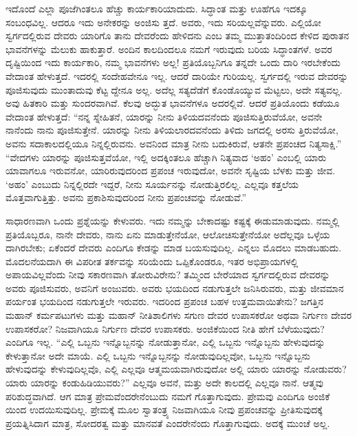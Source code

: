 ಇದೊಂದೆ ಎಲ್ಲಾ ಪೂಜೆಗಿಂತಲೂ ಹೆಚ್ಚು ಕಾರ್ಯಕಾರಿಯಾದುದು. ಸಿದ್ಧಾಂತ ಮತ್ತು ಊಹೆಗೂ ಇದಕ್ಕೂ ಸಂಬಂಧವಿಲ್ಲ. ಆದರೂ ಇದು ಅನೇಕರನ್ನು ಅಂಜಿಸು ತ್ತದೆ. ಅವರು, ಇದು ಸರಿಯಲ್ಲವೆನ್ನುವರು. ಎಲ್ಲಿಯೋ ಸ್ವರ್ಗದಲ್ಲಿರುವ ದೇವರು ಯಾರಿಗೊ ತಾನು ದೇವರೆಂದು ಹೇಳಿದನು ಎಂಬ ತಮ್ಮ ಮುತ್ತಾತಂದಿರಿಂದ ಕೇಳಿದ ಪುರಾತನ ಭಾವನೆಗಳನ್ನು ಮೆಲುಕು ಹಾಕುತ್ತಾರೆ. ಅಂದಿನ ಕಾಲದಿಂದಲೂ ನಮಗೆ ಇರುವುದು ಬರಿಯ ಸಿದ್ಧಾಂತಗಳೆ. ಅವರ ದೃಷ್ಟಿಯಿಂದ ಇದು ಕಾರ್ಯಕಾರಿ, ನಮ್ಮ ಭಾವನೆಗಳು ಅಲ್ಲ! ಪ್ರತಿಯೊಬ್ಬನಿಗೂ ತನ್ನದೇ ಒಂದು ದಾರಿ ಇರಬೇಕೆಂದು ವೇದಾಂತ ಹೇಳುತ್ತದೆ. ಇದರಲ್ಲಿ ಸಂದೇಹವೇನೂ ಇಲ್ಲ. ಆದರೆ ದಾರಿಯೇ ಗುರಿಯಲ್ಲ. ಸ್ವರ್ಗದಲ್ಲಿ ಇರುವ ದೇವರನ್ನು ಪೂಜಿಸುವುದು ಮುಂತಾದುವು ಕೆಟ್ಟ ದ್ದೇನೂ ಅಲ್ಲ. ಅದೆಲ್ಲ ಸತ್ಯದೆಡೆಗೆ ಕೊಂಡೊಯ್ಯುವ ಮೆಟ್ಟಲು, ಅದೇ ಸತ್ಯವಲ್ಲ. ಅವು ಹಿತಕಾರಿ ಮತ್ತು ಸುಂದರವಾಗಿವೆ. ಕೆಲವು ಅದ್ಭುತ ಭಾವನೆಗಳೂ ಅದರಲ್ಲಿವೆ. ಆದರೆ ಪ್ರತಿಯೊಂದು ಕಡೆಯೂ ವೇದಾಂತ ಹೇಳುತ್ತದೆ: “ನನ್ನ ಸ್ನೇಹಿತನೆ, ಯಾರನ್ನು ನೀನು ತಿಳಿಯದವನೆಂದು ಪೂಜಿಸುತ್ತಿರುವೆಯೋ, ಅವನೇ ನಾನೆಂದು ನಾನು ಪೂಜಿಸುತ್ತೇನೆ. ಯಾರನ್ನು ನೀನು ತಿಳಿಯಲಾರದವನೆಂದು ತಿಳಿದು ಜಗದಲ್ಲಿ ಅರಸು ತ್ತಿರುವೆಯೋ, ಅವನು ಸದಾಕಾಲದಲ್ಲಿಯೂ ನಿನ್ನಲ್ಲಿರುವನು. ಅವನಿಂದ ಮಾತ್ರ ನೀನು ಬದುಕಿರುವೆ, ಆತನೇ ಪ್ರಪಂಚದ ನಿತ್ಯಸಾಕ್ಷಿ.” “ವೇದಗಳು ಯಾರನ್ನು ಪೂಜಿಸುತ್ತವೆಯೋ, ಇಲ್ಲಿ ಅದಕ್ಕಿಂತಲೂ ಹೆಚ್ಚಾಗಿ ನಿತ್ಯವಾದ ‘ಅಹಂ’ ಎಂಬಲ್ಲಿ ಯಾರು ಯಾವಾಗಲೂ ಇರುವನೋ, ಯಾರಿರುವುದರಿಂದ ಪ್ರಪಂಚ ಇರುವುದೋ, ಅವನೇ ಸೃಷ್ಟಿಯ ಬೆಳಕು ಮತ್ತು ಜೀವ. ‘ಅಹಂ’ ಎಂಬುದು ನಿನ್ನಲ್ಲಿರದೇ ಇದ್ದರೆ, ನೀನು ಸೂರ್ಯನನ್ನು ನೋಡುತ್ತಿರಲಿಲ್ಲ. ಎಲ್ಲವೂ ಕತ್ತಲೆಯ ಮೊತ್ತವಾಗುತ್ತಿತ್ತು. ಅವನು ಪ್ರಕಾಶಿಸುವುದರಿಂದ ನೀನು ಪ್ರಪಂಚವನ್ನು ನೋಡುವೆ.”

ಸಾಧಾರಣವಾಗಿ ಒಂದು ಪ್ರಶ್ನೆಯನ್ನು ಕೇಳುವರು. ಇದು ನಮ್ಮನ್ನು ಬೇಕಾದಷ್ಟು ಕಷ್ಟಕ್ಕೆ ಈಡುಮಾಡುವುದು. ನಮ್ಮಲ್ಲಿ ಪ್ರತಿಯೊಬ್ಬರೂ, ನಾನೇ ದೇವರು, ನಾನು ಏನು ಮಾಡುತ್ತೇನೆಯೋ, ಆಲೋಚಿಸುತ್ತೇನೆಯೋ ಅದೆಲ್ಲವೂ ಒಳ್ಳೆಯ ದಾಗಿರಬೇಕು; ಏಕೆಂದರೆ ದೇವರು ಎಂದಿಗೂ ಕೇಡನ್ನು ಮಾಡ ಬಯಸುವುದಿಲ್ಲ. ಎನ್ನಲು ಮೊದಲು ಮಾಡಬಹುದು. ಮೊದಲನೆಯದಾಗಿ ಈ ವಿಪರೀತ ತರ್ಕವನ್ನು ಸರಿಯೆಂದು ಒಪ್ಪಿಕೊಂಡರೂ, ಇತರ ಅಭಿಪ್ರಾಯಗಳಲ್ಲಿ ಅಪಾಯವಿಲ್ಲವೆಂದು ನೀವು ಸಕಾರಣವಾಗಿ ತೋರುವಿರೇನು? ತಮ್ಮಿಂದ ಬೇರೆಯಾದ ಸ್ವರ್ಗದಲ್ಲಿರುವ ದೇವರನ್ನು ಅವರು ಪೂಜಿಸುವರು, ಅವನಿಗೆ ಅಂಜುವರು. ಅವರು ಭಯದಿಂದ ನಡುಗುತ್ತಲೇ ಜನಿಸಿರುವರು, ಮತ್ತು ಜೀವಮಾನ ಪರ್ಯಂತ ಭಯದಿಂದ ನಡುಗುತ್ತಲೇ ಇರುವರು. ಇದರಿಂದ ಪ್ರಪಂಚ ಬಹಳ ಉತ್ತಮವಾಯಿತೇನು? ಜಗತ್ತಿನ ಮಹಾನ್​ ಕರ್ಮಪಟುಗಳು ಮತ್ತು ಮಹಾನ್​ ನೀತಿಶಾಲಿಗಳು ಸಗುಣ ದೇವರ ಉಪಾಸಕರೋ ಅಥವಾ ನಿರ್ಗುಣ ದೇವರ ಉಪಾಸಕರೋ? ನಿಜವಾಗಿಯೂ ನಿರ್ಗುಣ ದೇವರ ಉಪಾಸಕರು. ಅಂಜಿಕೆಯಿಂದ ನೀತಿ ಹೇಗೆ ಬೆಳೆಯುವುದು? ಎಂದಿಗೂ ಇಲ್ಲ. “ಎಲ್ಲಿ ಒಬ್ಬನು ಇನ್ನೊಬ್ಬನನ್ನು ನೋಡುತ್ತಾನೋ, ಎಲ್ಲಿ ಒಬ್ಬನು ಇನ್ನೊಬ್ಬನು ಹೇಳುವುದನ್ನು ಕೇಳುತ್ತಾನೋ ಅದೇ ಮಾಯೆ. ಎಲ್ಲಿ ಒಬ್ಬನು ಇನ್ನೊಬ್ಬನನ್ನು ನೋಡುವುದಿಲ್ಲವೋ, ಒಬ್ಬನು ಇನ್ನೊಬ್ಬನು ಹೇಳುವುದನ್ನು ಕೇಳುವುದಿಲ್ಲವೊ, ಎಲ್ಲಿ ಎಲ್ಲವೂ ಆತ್ಮಮಯವಾಗಿರುವುದೋ ಅಲ್ಲಿ ಯಾರು ಯಾರನ್ನು ನೋಡುವರು? ಯಾರು ಯಾರನ್ನು ಕಂಡುಹಿಡಿಯುವರು?” ಎಲ್ಲವೂ ಅವನೆ, ಮತ್ತು ಅದೇ ಕಾಲದಲ್ಲಿ ಎಲ್ಲವೂ ನಾನೆ. ಆತ್ಮವು ಪರಿಶುದ್ಧವಾಗಿದೆ. ಆಗ ಮಾತ್ರ ಪ್ರೇಮವೆಂದರೇನೆಂಬುದು ನಮಗೆ ಗೊತ್ತಾಗುವುದು. ಪ್ರೇಮವು ಎಂದಿಗೂ ಅಂಜಿಕೆ ಯಿಂದ ಉದಯಿಸುವುದಿಲ್ಲ. ಪ್ರೇಮಕ್ಕೆ ಮೂಲ ಸ್ವಾತಂತ್ರ್ಯ ನಿಜವಾಗಿಯೂ ನೀವು ಪ್ರಪಂಚವನ್ನು ಪ್ರೀತಿಸುವುದಕ್ಕೆ ಪ್ರಯತ್ನಿಸಿದಾಗ ಮಾತ್ರ, ಸೋದರತ್ವ ಮತ್ತು ಮಾನವತೆ ಎಂದರೇನೆಂದು ಗೊತ್ತಾಗುವುದು. ಅದಕ್ಕೆ ಮುಂಚೆ ಅಲ್ಲ.

